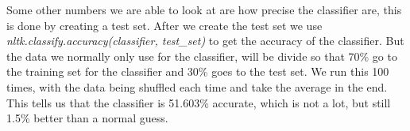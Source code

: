 Some other numbers we are able to look at are how precise the classifier are, this is done by creating a test set.
After we create the test set we use \textit{nltk.classify.accuracy(classifier, test_set)} to get the accuracy of the classifier. But the data we normally only use for the classifier, will be divide so that 70\% go to the training set for the classifier and 30\% goes to the test set. We run this 100 times, with the data being shuffled each time and take the average in the end. This tells us that the classifier is 51.603\% accurate, which is not a lot, but still 1.5\% better than a normal guess.